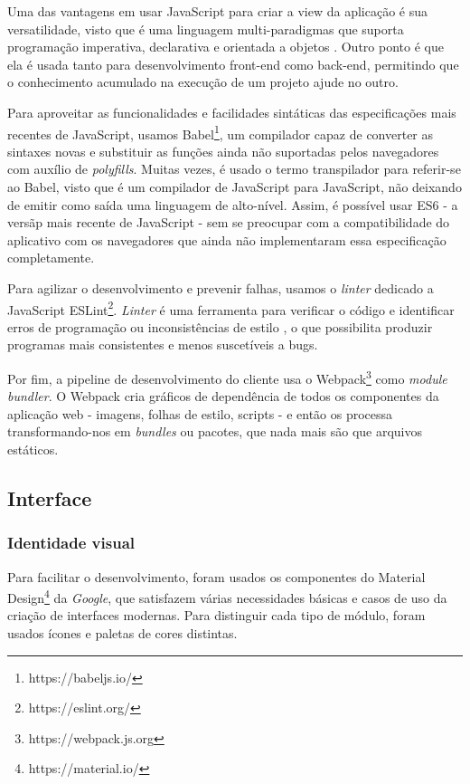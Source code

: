 Uma das vantagens em usar JavaScript para criar a view da aplicação é sua versatilidade, visto que é uma linguagem multi-paradigmas que suporta programação imperativa, declarativa e orientada a objetos \cite{mdnjs}. Outro ponto é que ela é usada tanto para desenvolvimento front-end como back-end, permitindo que o conhecimento acumulado na execução de um projeto ajude no outro.

Para aproveitar as funcionalidades e facilidades sintáticas das especificações mais recentes de JavaScript, usamos Babel\footnote{https://babeljs.io/}, um compilador capaz de converter as sintaxes novas e substituir as funções ainda não suportadas pelos navegadores com auxílio de \textit{polyfills}. Muitas vezes, é usado o termo transpilador para referir-se ao Babel, visto que é um compilador de JavaScript para JavaScript, não deixando de emitir como saída uma linguagem de alto-nível. Assim, é possível usar ES6 - a versãp mais recente de JavaScript - sem se preocupar com a compatibilidade do aplicativo com os navegadores que ainda não implementaram essa especificação completamente.

Para agilizar o desenvolvimento e prevenir falhas, usamos o \textit{linter} dedicado a JavaScript ESLint\footnote{https://eslint.org/}. \textit{Linter} é uma ferramenta para verificar o código e identificar erros de programação ou inconsistências de estilo \cite{linter}, o que possibilita produzir programas mais consistentes e menos suscetíveis a bugs.

Por fim, a pipeline de desenvolvimento do cliente usa o Webpack\footnote{https://webpack.js.org} como \textit{module bundler}. O Webpack cria gráficos de dependência de todos os componentes da aplicação web - imagens, folhas de estilo, scripts - e então os processa transformando-nos em \textit{bundles} ou pacotes, que nada mais são que arquivos estáticos.

\subsection{Interface}

\subsubsection{Identidade visual}

Para facilitar o desenvolvimento, foram usados os componentes do Material Design\footnote{https://material.io/} da \emph{Google}, que satisfazem várias necessidades básicas e casos de uso da criação de interfaces modernas. Para distinguir cada tipo de módulo, foram usados ícones e paletas de cores distintas.

